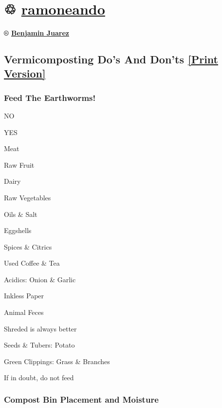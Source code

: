 \hypertarget{ramoneando}{%
\section{\texorpdfstring{♲
\href{../citas/romero-silvani.html}{ramoneando}}{♲ ramoneando}}\label{ramoneando}}

\hypertarget{benjamin-juarez}{%
\paragraph{\texorpdfstring{®
\href{https://twitter.com/venhamon}{Benjamin
Juarez}}{® Benjamin Juarez}}\label{benjamin-juarez}}

\hypertarget{Vermicomposting-Dos-And-Donts}{%
\subsection{\texorpdfstring{Vermicomposting Do's And Don'ts \textbar{}
\href{../docs/earthworms.pdf}{{[}Print
Version{]}}}{Vermicomposting Do's And Don'ts \textbar{} {[}Print Version{]}}}\label{Vermicomposting-Dos-And-Donts}}

\hypertarget{quuxe9-comer-para-las-lombrices-claro}{%
\subsubsection{Feed The
Earthworms!}\label{quuxe9-comer-para-las-lombrices-claro}}

{NO}

{YES}

Meat

Raw Fruit

Dairy

Raw Vegetables

Oils \& Salt

Eggshells

Spices \& Citrics

Used Coffee \& Tea

Acidics: Onion \& Garlic

Inkless Paper

Animal Feces

Shreded is always better

Seeds \& Tubers: Potato

Green Clippings: Grass \& Branches

If in doubt, do not feed

\hypertarget{compost-bin-placement-and-moisture}{%
\subsubsection{Compost Bin Placement and
Moisture}\label{compost-bin-placement-and-moisture}}

